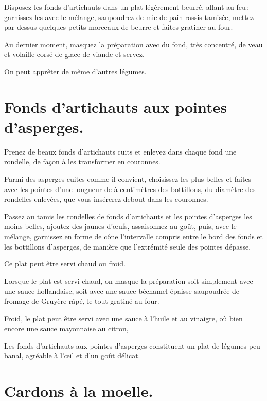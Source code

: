 Disposez les fonds d'artichauts dans un plat légèrement beurré, allant au feu ;
garnissez-les avec le mélange, saupoudrez de mie de pain rassis tamisée, mettez
par-dessus quelques petits morceaux de beurre et faites gratiner au four.

Au dernier moment, masquez la préparation avec du fond, très concentré, de
veau et volaille corsé de glace de viande et servez.

\sk

On peut apprêter de même d'autres légumes.

\section*{\centering Fonds d’artichauts aux pointes d'asperges.}
{}

Prenez de beaux fonds d'artichauts cuits et enlevez dans chaque fond une
rondelle, de façon à les transformer en couronnes.

Parmi des asperges cuites comme il convient, choisissez les plus belles et
faites avec les pointes d'une longueur de {\mmm} à {\mmm} centimètres
des bottillons, du diamètre des rondelles enlevées, que vous insérerez debout
dans les couronnes.

Passez au tamis les rondelles de fonds d'artichauts et les pointes d’asperges
les moins belles, ajoutez des jaunes d'œufs, assaisonnez au goût, puis, avec le
mélange, garnissez en forme de cône l'intervalle compris entre le bord des
fonds et les bottillons d'asperges, de manière que l'extrémité seule des
pointes dépasse.

\medskip

Ce plat peut être servi chaud ou froid.

Lorsque le plat est servi chaud, on masque la préparation soit simplement
avec une sauce hollandaise, soit avec une sauce béchamel épaisse saupoudrée de
fromage de Gruyère râpé, le tout gratiné au four.

Froid, le plat peut être servi avec une sauce à l'huile et au vinaigre, où bien
encore une sauce mayonnaise au citron,

\medskip

Les fonds d'artichauts aux pointes d'asperges constituent un plat de légumes
peu banal, agréable à l'œil et d'un goût délicat.

\section*{\centering Cardons à la moelle.}
{}

